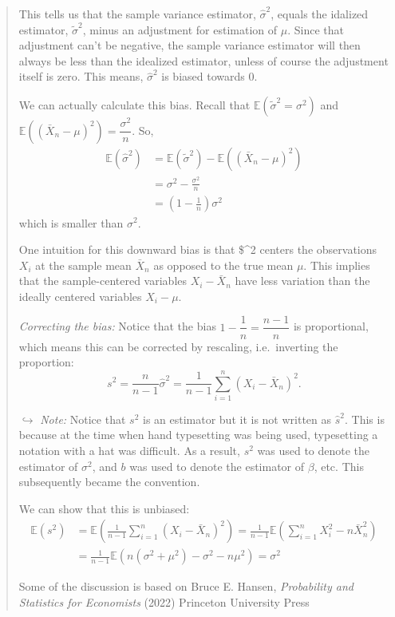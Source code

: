 \documentclass[
]{article}
\begin{document}
\begin{quote}
This tells us that the sample variance estimator,
\(\widehat{\sigma}^2\), equals the idalized estimator,
\(\widetilde{\sigma}^2\), minus an adjustment for estimation of \(\mu\).
Since that adjustment can't be negative, the sample variance estimator
will then always be less than the idealized estimator, unless of course
the adjustment itself is zero. This means, \(\widehat{\sigma}^2\) is
biased towards 0.

We can actually calculate this bias. Recall that
\(\mathbb{E}(\widetilde{\sigma}^2 = \sigma^2)\) and
\(\mathbb{E}\left((\bar{X}_n - \mu)^2\right) = \dfrac{\sigma^2}{n}\).
So, \[
\begin{align*}
\mathbb{E}(\widehat{\sigma}^2) &= \mathbb{E}(\widetilde{\sigma}^2) - \mathbb{E}\left((\bar{X}_n - \mu)^2\right) \\[4pt]
&= \sigma^2 - \frac{\sigma^2}{n} \\[4pt]
&= \left(1 - \frac{1}{n}\right)\sigma^2
\end{align*}
\] which is smaller than \(\sigma^2\).

One intuition for this downward bias is that \$\widehat{\sigma}\^{}2
centers the observations \(X_i\) at the sample mean \(\bar{X}_n\) as
opposed to the true mean \(\mu\). This implies that the sample-centered
variables \(X_i - \bar{X}_n\) have less variation than the ideally
centered variables \(X_i - \mu\).

\emph{Correcting the bias:} Notice that the bias
\(1 - \dfrac{1}{n} = \dfrac{n-1}{n}\) is proportional, which means this
can be corrected by rescaling, i.e.~inverting the proportion: \[
s^2 = \frac{n}{n-1}\widehat{\sigma}^2 = \frac{1}{n-1}\displaystyle{\sum_{i=1}^n(X_i - \bar{X}_n)^2}.
\]

\(\hookrightarrow\) \emph{Note:} Notice that \(s^2\) is an estimator but
it is not written as \(\widehat{s}^2\). This is because at the time when
hand typesetting was being used, typesetting a notation with a hat was
difficult. As a result, \(s^2\) was used to denote the estimator of
\(\sigma^2\), and \(b\) was used to denote the estimator of \(\beta\),
etc. This subsequently became the convention.

We can show that this is unbiased: \[
\begin{align*}
\mathbb{E}(s^2) &= \mathbb{E}\left(\frac{1}{n-1}\displaystyle{\sum_{i=1}^n(X_i - \bar{X}_n)^2}\right) = \frac{1}{n-1}\mathbb{E}\left(\displaystyle{\sum_{i=1}^nX_i^2 - n\bar{X}_n^2}\right) \\[4pt]
&= \frac{1}{n-1}\mathbb{E}(n(\sigma^2+\mu^2)-\sigma^2-n\mu^2)=\sigma^2
\end{align*}
\]

Some of the discussion is based on Bruce E. Hansen, \emph{Probability
and Statistics for Economists} (2022) Princeton University Press
\end{quote}
\end{document}
